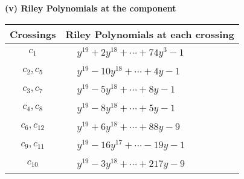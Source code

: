 \documentclass[1p]{elsarticle_modified}
\theoremstyle{definition}
\begin{document}
\newpage\renewcommand{\arraystretch}{1}
\flushleft \textbf{(v) Riley Polynomials at the component}\newline \\
\begin{tabular}{m{50pt}|m{274pt}}
Crossings & \hspace{64pt}Riley Polynomials at each crossing \\
\hline $$\begin{aligned}c_{1}\end{aligned}$$&$\begin{aligned}
&y^{19}+2 y^{18}+\cdots+74 y^3-1
\end{aligned}$\\
\hline $$\begin{aligned}c_{2},c_{5}\end{aligned}$$&$\begin{aligned}
&y^{19}-10 y^{18}+\cdots+4 y-1
\end{aligned}$\\
\hline $$\begin{aligned}c_{3},c_{7}\end{aligned}$$&$\begin{aligned}
&y^{19}-5 y^{18}+\cdots+8 y-1
\end{aligned}$\\
\hline $$\begin{aligned}c_{4},c_{8}\end{aligned}$$&$\begin{aligned}
&y^{19}-8 y^{18}+\cdots+5 y-1
\end{aligned}$\\
\hline $$\begin{aligned}c_{6},c_{12}\end{aligned}$$&$\begin{aligned}
&y^{19}+6 y^{18}+\cdots+88 y-9
\end{aligned}$\\
\hline $$\begin{aligned}c_{9},c_{11}\end{aligned}$$&$\begin{aligned}
&y^{19}-16 y^{17}+\cdots-19 y-1
\end{aligned}$\\
\hline $$\begin{aligned}c_{10}\end{aligned}$$&$\begin{aligned}
&y^{19}-3 y^{18}+\cdots+217 y-9
\end{aligned}$\\
\hline
\end{tabular}\\~\\
\end{document}
